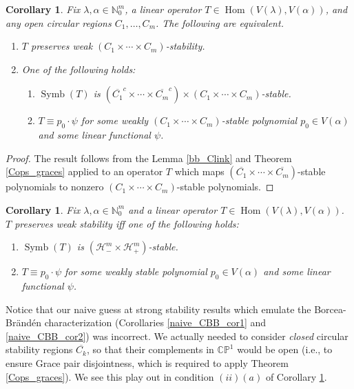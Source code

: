 \documentclass{article}
\newtheorem{corollary}[theorem]{Corollary}
\theoremstyle{definition}
\theoremstyle{plain}
\newcommand{\N}{\mathbb{N}}
\newcommand{\CP}{\mathbb{CP}}
\newcommand{\UHP}{\mathcal{H}_+}
\newcommand{\LHP}{\mathcal{H}_-}
\DeclareMathOperator{\Symb}{Symb}
\DeclareMathOperator{\Hom}{Hom}
\begin{document}
\begin{corollary}\label{CBB_cor1}
    Fix $\lambda,\alpha \in \N_0^m$, a linear operator $T \in \Hom(V(\lambda),V(\alpha))$, and any open circular regions $C_1, \ldots, C_m$. The following are equivalent.
    \begin{enumerate}[label=(\roman*)]
        \item $T$ preserves weak $(C_1 \times \cdots \times C_m)$-stability.
        \item One of the following holds:
            \begin{enumerate}[label=(\alph*)]
                \item $\Symb(T)$ is $(\overline{C_1}^c \times \cdots \times \overline{C_m}^c) \times (C_1 \times \cdots \times C_m)$-stable.
                \item $T \equiv p_0 \cdot \psi$ for some weakly $(C_1 \times \cdots \times C_m)$-stable polynomial $p_0 \in V(\alpha)$ and some linear functional $\psi$.
            \end{enumerate}
    \end{enumerate}
\end{corollary}
\begin{proof}
    The result follows from the Lemma \ref{bb_Clink} and Theorem \ref{Cops_graces} applied to an operator $T$ which maps $(\overline{C_1} \times \cdots \times \overline{C_m})$-stable polynomials to nonzero $(C_1 \times \cdots \times C_m)$-stable polynomials.
\end{proof}

\begin{corollary}\label{CBB_cor2}
    Fix $\lambda,\alpha \in \N_0^m$ and a linear operator $T \in \Hom(V(\lambda),V(\alpha))$. $T$ preserves weak stability iff one of the following holds:
    \begin{enumerate}[label=(\alph*)]
        \item $\Symb(T)$ is $(\LHP^m \times \UHP^m)$-stable.
        \item $T \equiv p_0 \cdot \psi$ for some weakly stable polynomial $p_0 \in V(\alpha)$ and some linear functional $\psi$.
    \end{enumerate}
\end{corollary}

Notice that our naive guess at strong stability results which emulate the Borcea-Br{\"a}nd{\'e}n characterization (Corollaries \ref{naive_CBB_cor1} and \ref{naive_CBB_cor2}) was incorrect. We actually needed to consider \emph{closed} circular stability regions $\overline{C_k}$, so that their complements in $\CP^1$ would be open (i.e., to ensure Grace pair disjointness, which is required to apply Theorem \ref{Cops_graces}). We see this play out in condition $(ii)(a)$ of Corollary \ref{CBB_cor1}.
\end{document}
